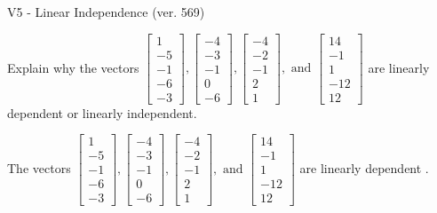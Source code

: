 \begin{exercise}
  \begin{exerciseTitle}V5 - Linear Independence (ver. 569)\end{exerciseTitle}
  \begin{exerciseStatement}
    Explain why the vectors \(\left[\begin{array}{r}
1 \\
-5 \\
-1 \\
-6 \\
-3
\end{array}\right] , \left[\begin{array}{r}
-4 \\
-3 \\
-1 \\
0 \\
-6
\end{array}\right] , \left[\begin{array}{r}
-4 \\
-2 \\
-1 \\
2 \\
1
\end{array}\right] , \text{ and } \left[\begin{array}{r}
14 \\
-1 \\
1 \\
-12 \\
12
\end{array}\right]\) are linearly dependent or linearly independent.	


  \end{exerciseStatement}
  \begin{exerciseAnswer}
   The vectors \(\left[\begin{array}{r}
1 \\
-5 \\
-1 \\
-6 \\
-3
\end{array}\right] , \left[\begin{array}{r}
-4 \\
-3 \\
-1 \\
0 \\
-6
\end{array}\right] , \left[\begin{array}{r}
-4 \\
-2 \\
-1 \\
2 \\
1
\end{array}\right] , \text{ and } \left[\begin{array}{r}
14 \\
-1 \\
1 \\
-12 \\
12
\end{array}\right]\) are 
  	 linearly dependent  .
  


  \end{exerciseAnswer}
\end{exercise}